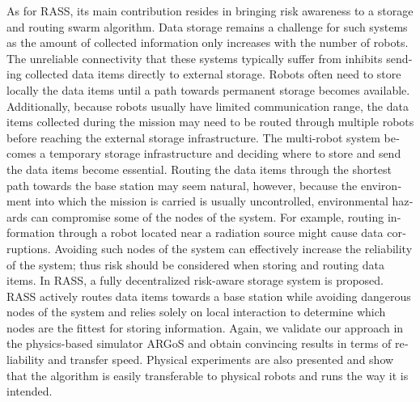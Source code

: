 \begin{otherlanguage}{english}
As for RASS, its main contribution resides in bringing risk awareness to a storage and routing swarm algorithm. Data storage remains a challenge for such systems as the amount of collected information only increases with the number of robots. The unreliable connectivity that these systems typically suffer from inhibits sending collected data items directly to external storage. Robots often need to store locally the data items until a path towards permanent storage becomes available. Additionally, because robots usually have limited communication range, the data items collected during the mission may need to be routed through multiple robots before reaching the external storage infrastructure. The multi-robot system becomes a temporary storage infrastructure and deciding where to store and send the data items become essential. Routing the data items through the shortest path towards the base station may seem natural, however, because the environment into which the mission is carried is usually uncontrolled, environmental hazards can compromise some of the nodes of the system. For example, routing information through a robot located near a radiation source might cause data corruptions. Avoiding such nodes of the system can effectively increase the reliability of the system; thus risk should be considered when storing and routing data items. In RASS, a fully decentralized risk-aware storage system is proposed. RASS actively routes data items towards a base station while avoiding dangerous nodes of the system and relies solely on local interaction to determine which nodes are the fittest for storing information. Again, we validate our approach in the physics-based simulator ARGoS and obtain convincing results in terms of reliability and transfer speed. Physical experiments are also presented and show that the algorithm is easily transferable to physical robots and runs the way it is intended.
  


\end{otherlanguage}
